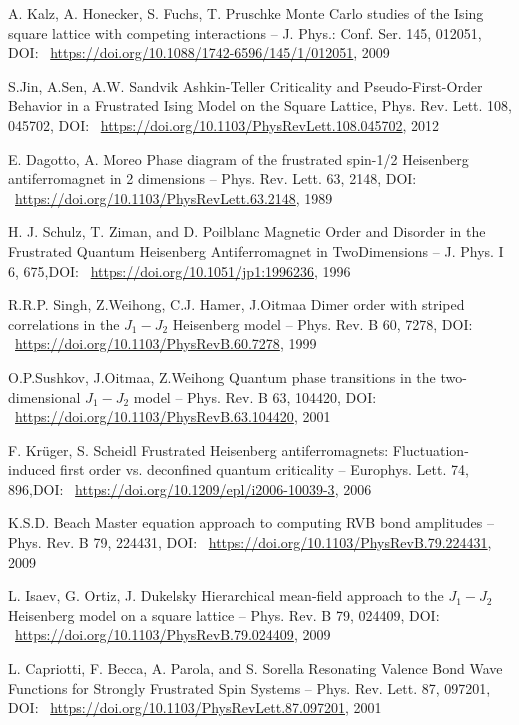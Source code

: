 \documentclass[11pt]{article}
\begin{document}
\begin{thebibliography}{3}
A. Kalz, A. Honecker, S. Fuchs, T. Pruschke Monte Carlo studies of the Ising square lattice with competing interactions -- J. Phys.: Conf. Ser. 145, 012051, DOI: ~\url{https://doi.org/10.1088/1742-6596/145/1/012051}, 2009

S.Jin, A.Sen, A.W. Sandvik Ashkin-Teller Criticality and Pseudo-First-Order Behavior in a Frustrated Ising Model on the Square Lattice, Phys. Rev. Lett. 108, 045702, DOI: ~\url{https://doi.org/10.1103/PhysRevLett.108.045702}, 2012 

E. Dagotto, A. Moreo Phase diagram of the frustrated spin-1/2 Heisenberg antiferromagnet in 2 dimensions -- Phys. Rev. Lett. 63, 2148, DOI: ~\url{https://doi.org/10.1103/PhysRevLett.63.2148}, 1989

H. J. Schulz, T. Ziman, and D. Poilblanc Magnetic Order and Disorder in the Frustrated Quantum Heisenberg Antiferromagnet in TwoDimensions -- J. Phys. I 6, 675,DOI: ~\url{https://doi.org/10.1051/jp1:1996236}, 1996

R.R.P. Singh, Z.Weihong, C.J. Hamer, J.Oitmaa Dimer order with striped correlations in the $J_1-J_2$ Heisenberg model -- Phys. Rev. B 60, 7278, DOI: ~\url{https://doi.org/10.1103/PhysRevB.60.7278}, 1999

O.P.Sushkov, J.Oitmaa, Z.Weihong Quantum phase transitions in the two-dimensional $J_1-J_2$ model -- Phys. Rev. B 63, 104420, DOI: ~\url{https://doi.org/10.1103/PhysRevB.63.104420}, 2001

F. Krüger,  S. Scheidl Frustrated Heisenberg antiferromagnets: Fluctuation-induced first order vs. deconfined quantum criticality -- Europhys. Lett. 74, 896,DOI: ~\url{https://doi.org/10.1209/epl/i2006-10039-3}, 2006

K.S.D. Beach Master equation approach to computing RVB bond amplitudes -- Phys. Rev. B 79, 224431, DOI: ~\url{https://doi.org/10.1103/PhysRevB.79.224431}, 2009

L. Isaev, G. Ortiz, J. Dukelsky Hierarchical mean-field approach to the $J_1-J_2$ Heisenberg model on a square lattice -- Phys. Rev. B 79, 024409, DOI: ~\url{https://doi.org/10.1103/PhysRevB.79.024409}, 2009

L. Capriotti, F. Becca, A. Parola, and S. Sorella Resonating Valence Bond Wave Functions for Strongly Frustrated Spin Systems -- Phys. Rev. Lett. 87, 097201, DOI: ~\url{https://doi.org/10.1103/PhysRevLett.87.097201}, 2001


\end{thebibliography}
\end{document}
